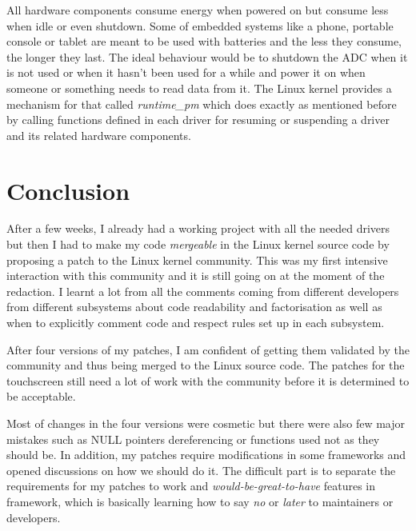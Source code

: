 All hardware components consume energy when powered on but consume less when idle or even shutdown. Some of embedded systems like a phone, portable console or tablet are meant to be used with batteries and the less they consume, the longer they last. The ideal behaviour would be to shutdown the ADC when it is not used or when it hasn't been used for a while and power it on when someone or something needs to read data from it. The Linux kernel provides a mechanism for that called \textit{runtime\_pm} which does exactly as mentioned before by calling functions defined in each driver for resuming or suspending a driver and its related hardware components.

\section{Conclusion}
After a few weeks, I already had a working project with all the needed drivers but then I had to make my code \textit{mergeable} in the Linux kernel source code by proposing a patch to the Linux kernel community. This was my first intensive interaction with this community and it is still going on at the moment of the redaction. I learnt a lot from all the comments coming from different developers from different subsystems about code readability and factorisation as well as when to explicitly comment code and respect rules set up in each subsystem.

After four versions of my patches, I am confident of getting them validated by the community and thus being merged to the Linux source code. The patches for the touchscreen still need a lot of work with the community before it is determined to be acceptable.

Most of changes in the four versions were cosmetic but there were also few major mistakes such as NULL pointers dereferencing or functions used not as they should be. In addition, my patches require modifications in some frameworks and opened discussions on how we should do it. The difficult part is to separate the requirements for my patches to work and \textit{would-be-great-to-have} features in framework, which is basically learning how to say \textit{no} or \textit{later} to maintainers or developers.
